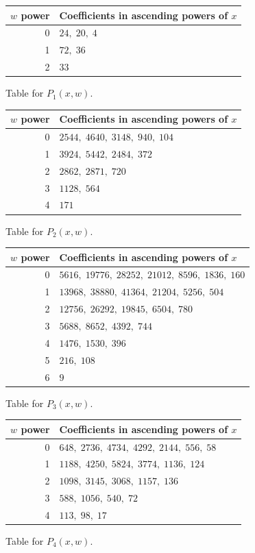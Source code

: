\begin{center}
\small
\begin{tabular}{r l}
\toprule
$w$ power & Coefficients in ascending powers of $x$ \\
\midrule
0 & $24,\;20,\;4$ \\
1 & $72,\;36$ \\
2 & $33$ \\
\bottomrule
\end{tabular}
\end{center}
\noindent Table for $P_1(x,w)$.

\begin{center}
\small
\begin{tabular}{r l}
\toprule
$w$ power & Coefficients in ascending powers of $x$ \\
\midrule
0 & $2544,\;4640,\;3148,\;940,\;104$ \\
1 & $3924,\;5442,\;2484,\;372$ \\
2 & $2862,\;2871,\;720$ \\
3 & $1128,\;564$ \\
4 & $171$ \\
\bottomrule
\end{tabular}
\end{center}
\noindent Table for $P_2(x,w)$.

\begin{center}
\small
\begin{tabular}{r l}
\toprule
$w$ power & Coefficients in ascending powers of $x$ \\
\midrule
0 & $5616,\;19776,\;28252,\;21012,\;8596,\;1836,\;160$ \\
1 & $13968,\;38880,\;41364,\;21204,\;5256,\;504$ \\
2 & $12756,\;26292,\;19845,\;6504,\;780$ \\
3 & $5688,\;8652,\;4392,\;744$ \\
4 & $1476,\;1530,\;396$ \\
5 & $216,\;108$ \\
6 & $9$ \\
\bottomrule
\end{tabular}
\end{center}
\noindent Table for $P_3(x,w)$.

\begin{center}
\small
\begin{tabular}{r l}
\toprule
$w$ power & Coefficients in ascending powers of $x$ \\
\midrule
0 & $648,\;2736,\;4734,\;4292,\;2144,\;556,\;58$ \\
1 & $1188,\;4250,\;5824,\;3774,\;1136,\;124$ \\
2 & $1098,\;3145,\;3068,\;1157,\;136$ \\
3 & $588,\;1056,\;540,\;72$ \\
4 & $113,\;98,\;17$ \\
\bottomrule
\end{tabular}
\end{center}
\noindent Table for $P_4(x,w)$.

